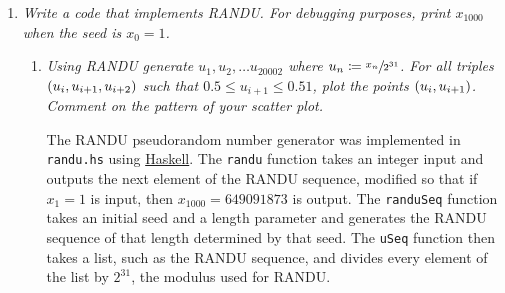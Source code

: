 \documentclass{article}
\renewcommand{\leq}{\leqslant}
\renewcommand{\geq}{\geqslant}
\newcommand{\defn}{\coloneqq}
\DeclarePairedDelimiter \parens{(}{)}
\begin{document}
\begin{enumerate}
\begin{proof}
\begin{alignat*}{2}
                &\equiv a^{k+1}x_n + \frac{a^{k+1} - 1}{a - 1}c &&\mod{m}.
            \end{alignat*}
            Therefore, for all $n \in \mathbb{N}$ and $k \in \mathbb{N}$, we can conclude that $a \geq 2$ implies
            \begin{equation*}
                x_{n+k} \equiv a^kx_n + \frac{a^k - 1}{a - 1}c \mod{m}.
            \end{equation*}
        \end{proof}
    \item
        {\it Write a code that implements RANDU. For debugging purposes, print $x_{1000}$ when the seed is $x_0 = 1$.}
        \begin{enumerate}
            \item
                {\it Using RANDU generate $u_1, u_2, \dots u_{20002}$ where $u_n \defn \sfrac{x_n}{2^{31}}$.
                For all triples $\parens*{u_i, u_{i+1}, u_{i+2}}$ such that $0.5 \leq u_{i+1} \leq 0.51$, plot the points $\parens*{u_i, u_{i+1}}$.
                Comment on the pattern of your scatter plot.}

                The RANDU pseudorandom number generator was implemented in \texttt{randu.hs} using \href{https://www.haskell.org/}{Haskell}.
                The \texttt{randu} function takes an integer input and outputs the next element of the RANDU sequence,
                modified so that if $x_1 = 1$ is input, then $x_{1000} = 649091873$ is output.
                The \texttt{randuSeq} function takes an initial seed and a length parameter and generates the RANDU sequence of that length determined by that seed.
                The \texttt{uSeq} function then takes a list, such as the RANDU sequence, and divides every element of the list by $2^{31}$, the modulus used for RANDU.


\end{enumerate}
\end{enumerate}
\end{document}

